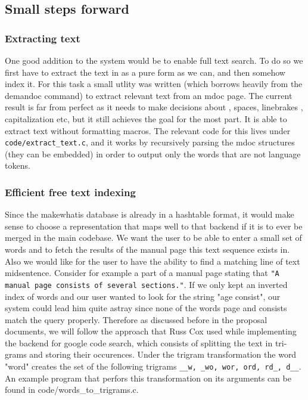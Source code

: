 \documentclass{report}
\begin{document}
\subsection*{Small steps forward}

\subsubsection*{Extracting text}
One good addition to the system would be to enable full text search. To do so we first have to extract the text in as a pure form as we can, and then somehow index it.
For this task a small utlity was written (which borrows heavily from the demandoc command) to extract relevant text from an mdoc page. The current result is far from perfect
as it needs to make decisions about , spaces, linebrakes , capitalization etc, but it still achieves the goal for the most part. It is able to extract text without formatting
macros. The relevant code for this lives under {\tt code/extract\_text.c}, and it works by recursively parsing the mdoc structures (they can be embedded) in order to 
output only the words that are not language tokens. 
\subsubsection*{Efficient free text indexing}
Since the makewhatis database is already in a hashtable format, it would make sense to choose a representation that maps well to that backend if it is to ever be merged in the
main codebase. We want the user to be able to enter a small set of words and to fetch the results of the manual page this text sequence exists in. Also we would like for
the user to have the ability to find a matching line of text midsentence. Consider for example a part of a manual page stating that {\tt "A manual page consists of several sections."}.
If we only kept an inverted index of words and our user wanted to look for the string "age consist", our system could lead him quite astray since none of the words page and consists match
the query properly. Therefore as discussed before in the proposal documents, we will follow the approach that Russ Cox used while implementing the backend for google code search, which consists
of splitting the text in tri-grams and storing their occurences. Under the trigram transformation the word "word" creates the set of the following trigrams
{\tt \_\_w, \_wo, wor, ord, rd\_, d\_\_}. An example program that perfors this transformation on its arguments can be found in {code/words\_to\_trigrams.c}.
\end{document}
